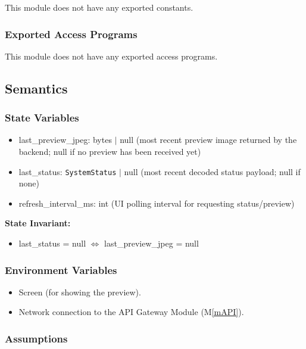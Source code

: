 \documentclass[12pt, titlepage]{article}
\newcommand{\mref}[1]{M\ref{#1}}
\begin{document}
This module does not have any exported constants.

\subsubsection{Exported Access Programs}

This module does not have any exported access programs.

\subsection{Semantics}

\subsubsection{State Variables}

\begin{itemize}
  \item last\_preview\_jpeg: bytes $|$ null (most recent preview image returned by the
        backend; null if no preview has been received yet)
  \item last\_status: \texttt{SystemStatus} $|$ null (most recent decoded status
        payload; null if none)
  \item refresh\_interval\_ms: int (UI polling interval for requesting status/preview)
\end{itemize}

\noindent \textbf{State Invariant:}
\begin{itemize}
  \item last\_status = null $\Leftrightarrow$ last\_preview\_jpeg = null
\end{itemize}

\subsubsection{Environment Variables}

\begin{itemize}
  \item Screen (for showing the preview).
  \item Network connection to the API Gateway Module (\mref{mAPI}).
\end{itemize}

\subsubsection{Assumptions}
\end{document}
